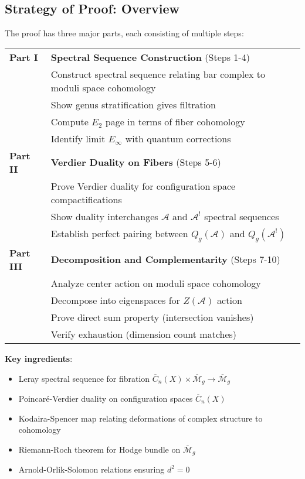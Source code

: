 \subsection{Strategy of Proof: Overview}

The proof has three major parts, each consisting of multiple steps:

\begin{center}
\begin{tabular}{|l|p{10cm}|}
\hline
\textbf{Part I} & \textbf{Spectral Sequence Construction} (Steps 1-4)\\
& Construct spectral sequence relating bar complex to moduli space cohomology\\
& Show genus stratification gives filtration\\
& Compute $E_2$ page in terms of fiber cohomology\\
& Identify limit $E_\infty$ with quantum corrections\\
\hline
\textbf{Part II} & \textbf{Verdier Duality on Fibers} (Steps 5-6)\\
& Prove Verdier duality for configuration space compactifications\\
& Show duality interchanges $\mathcal{A}$ and $\mathcal{A}^!$ spectral sequences\\
& Establish perfect pairing between $Q_g(\mathcal{A})$ and $Q_g(\mathcal{A}^!)$\\
\hline
\textbf{Part III} & \textbf{Decomposition and Complementarity} (Steps 7-10)\\
& Analyze center action on moduli space cohomology\\
& Decompose into eigenspaces for $Z(\mathcal{A})$ action\\
& Prove direct sum property (intersection vanishes)\\
& Verify exhaustion (dimension count matches)\\
\hline
\end{tabular}
\end{center}

\textbf{Key ingredients}:
\begin{itemize}
\item Leray spectral sequence for fibration $\overline{C}_n(X) \times \overline{
\mathcal{M}}_g \to \overline{\mathcal{M}}_g$
\item Poincaré-Verdier duality on configuration spaces $\overline{C}_n(X)$
\item Kodaira-Spencer map relating deformations of complex structure to cohomology
\item Riemann-Roch theorem for Hodge bundle on $\overline{\mathcal{M}}_g$
\item Arnold-Orlik-Solomon relations ensuring $d^2 = 0$
\end{itemize}

